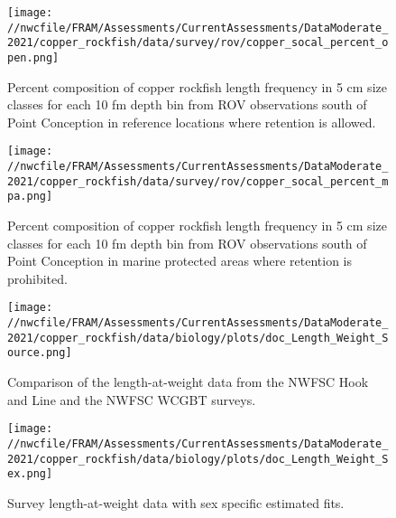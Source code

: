 \documentclass[11pt,
  english,
  a4paper,
]{article}
\begin{document}
\begin{figure}
\centering
\texttt{[image: //nwcfile/FRAM/Assessments/CurrentAssessments/DataModerate\_2021/copper\_rockfish/data/survey/rov/copper\_socal\_percent\_open.png]}
\caption{Percent composition of copper rockfish length frequency in 5 cm size classes for each 10 fm depth bin from ROV observations south of Point Conception in reference locations where retention is allowed.\label{fig:rov-percent-open}}
\end{figure}

\tagmcend\tagstructend


\begin{figure}
\centering
\texttt{[image: //nwcfile/FRAM/Assessments/CurrentAssessments/DataModerate\_2021/copper\_rockfish/data/survey/rov/copper\_socal\_percent\_mpa.png]}
\caption{Percent composition of copper rockfish length frequency in 5 cm size classes for each 10 fm depth bin from ROV observations south of Point Conception in marine protected areas where retention is prohibited.\label{fig:rov-percent-mpa}}
\end{figure}

\tagmcend\tagstructend


\begin{figure}
\centering
\texttt{[image: //nwcfile/FRAM/Assessments/CurrentAssessments/DataModerate\_2021/copper\_rockfish/data/biology/plots/doc\_Length\_Weight\_Source.png]}
\caption{Comparison of the length-at-weight data from the NWFSC Hook and Line and the NWFSC WCGBT surveys.\label{fig:len-weight-survey}}
\end{figure}

\tagmcend\tagstructend


\begin{figure}
\centering
\texttt{[image: //nwcfile/FRAM/Assessments/CurrentAssessments/DataModerate\_2021/copper\_rockfish/data/biology/plots/doc\_Length\_Weight\_Sex.png]}
\caption{Survey length-at-weight data with sex specific estimated fits.\label{fig:len-weight}}
\end{figure}
\end{document}

